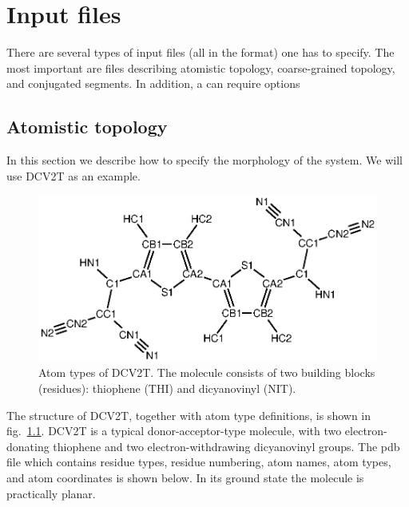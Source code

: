 \chapter{Input files}
\label{sec:mapping}

\newcommand{\ctpmap}{\hyperref[prog:ctp_map]{\texttt{ctp\_map}}\xspace}
\newcommand{\dumptraj}{\hyperref[calc:dumptraj]{\texttt{dumptraj}}\xspace}
\newcommand{\calculaor}{\hyperref[sec:alculators]{\texttt{calculator}}\xspace}

There are several types of input files (all in the \xml format) one has to specify. The most important are files describing atomistic topology, coarse-grained topology, and conjugated segments. In addition, a \calculator can require options 

\section{Atomistic topology}
\label{sec:atomistic}
In this section we describe how to specify the morphology of the system. We will use DCV2T as an example.

\begin{figure}
\centering
\includegraphics[width=0.9\linewidth]{./fig/chemical_structure/dcv2t_atom_types}
\caption{\small Atom types of DCV2T. The molecule consists of two building blocks (residues): thiophene (THI) and dicyanovinyl (NIT). }
\label{fig:dcv2t_at}
\end{figure}

The structure of DCV2T, together with atom type definitions, is shown in fig.~\ref{fig:dcv2t_at}. DCV2T is a typical donor-acceptor-type molecule, with two electron-donating thiophene and two electron-withdrawing dicyanovinyl groups. The pdb file which contains residue types, residue numbering, atom names, atom types, and atom coordinates is shown below. In its ground state the molecule is practically planar. 

